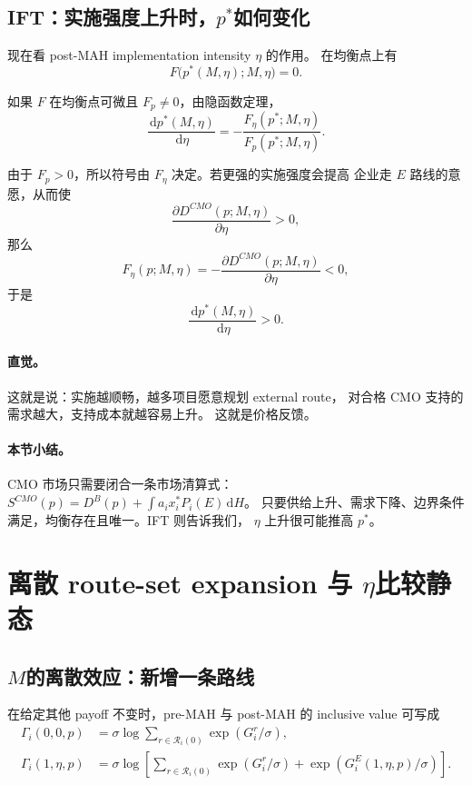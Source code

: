 \documentclass[12pt,UTF8]{ctexart}
\newcommand{\dd}{\,\mathrm{d}}
\newcommand{\Rset}{\mathcal{R}}
\theoremstyle{plain}
\theoremstyle{remark}
\begin{document}
\subsection{IFT：实施强度上升时，\texorpdfstring{$p^*$}{均衡支持成本}如何变化}

现在看 post-MAH implementation intensity $\eta$ 的作用。
在均衡点上有
\[
F\bigl(p^*(M,\eta);M,\eta\bigr)=0.
\]

如果 $F$ 在均衡点可微且 $F_p\neq 0$，由隐函数定理，
\begin{equation}
\frac{\dd p^*(M,\eta)}{\dd \eta}
=
-\frac{F_\eta(p^*;M,\eta)}{F_p(p^*;M,\eta)}.
\label{eq:ift}
\end{equation}

由于 $F_p>0$，所以符号由 $F_\eta$ 决定。若更强的实施强度会提高
企业走 $E$ 路线的意愿，从而使
\[
\frac{\partial D^{CMO}(p;M,\eta)}{\partial \eta}>0,
\]
那么
\[
F_\eta(p;M,\eta)
=
-\frac{\partial D^{CMO}(p;M,\eta)}{\partial \eta}<0,
\]
于是
\begin{equation}
\frac{\dd p^*(M,\eta)}{\dd \eta}>0.
\label{eq:dpdeta_positive}
\end{equation}

\paragraph{直觉。}
这就是说：实施越顺畅，越多项目愿意规划 external route，
对合格 CMO 支持的需求越大，支持成本就越容易上升。
这就是价格反馈。

\paragraph{本节小结。}
CMO 市场只需要闭合一条市场清算式：
$S^{CMO}(p)=D^B(p)+\int a_i x_i^*P_i(E)\dd H$。
只要供给上升、需求下降、边界条件满足，均衡存在且唯一。IFT 则告诉我们，
$\eta$ 上升很可能推高 $p^*$。

\section{离散 route-set expansion 与 \texorpdfstring{$\eta$}{实施强度}比较静态}

\subsection{\texorpdfstring{$M$}{制度开放}的离散效应：新增一条路线}

在给定其他 payoff 不变时，pre-MAH 与 post-MAH 的 inclusive value 可写成
\begin{align}
\Gamma_i(0,0,p)
&=
\sigma\log
\sum_{r\in\Rset_i(0)}
\exp(G_i^r/\sigma),
\label{eq:gamma_pre}\\
\Gamma_i(1,\eta,p)
&=
\sigma\log
\left[
\sum_{r\in\Rset_i(0)}
\exp(G_i^r/\sigma)
+
\exp(G_i^E(1,\eta,p)/\sigma)
\right].
\label{eq:gamma_post}
\end{align}
\end{document}
